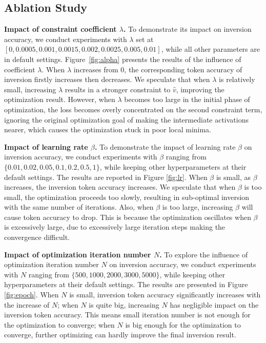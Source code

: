 \subsection{Ablation Study}

\noindent\textbf{Impact of constraint  coefficient $\lambda$.} To demonstrate its impact on inversion accuracy, we conduct experiments with $\lambda$ set at $[0,0.0005,0.001,0.0015,0.002,0.0025,0.005,0.01]$, while all other parameters are in default settings. Figure~\ref{fig:alpha}  presents the results of the influence of coefficient $\lambda$. When $\lambda$ increases from 0, the corresponding token accuracy of inversion firstly increases then decreases. We speculate that when $\lambda$ is relatively small, increasing $\lambda$ results in a stronger constraint to $\hat{v}$, improving the optimization result. 
However, when $\lambda$ becomes too large in the initial phase of optimization, the loss becomes overly concentrated on the second constraint term, ignoring the original optimization goal of making the intermediate activations nearer, which causes the optimization stuck in poor local minima.


\noindent\textbf{Impact of learning rate $\beta$.} To demonstrate the impact of learning rate $\beta$ on inversion accuracy, we conduct experiments with $\beta$ ranging from $\{0.01,0.02,0.05,0.1,0.2,0.5,1\}$, while keeping other hyperparameters at their default settings. The results are reported in Figure \ref{fig:lr}. When $\beta$ is small, as $\beta$ increases, the inversion token accuracy increases. We speculate that when $\beta$ is too small, the optimization proceeds too slowly, resulting in sub-optimal inversion with the same number of iterations. Also, when $\beta$ is too large, increasing $\beta$ will cause token accuracy to drop. 
This is because  the optimization oscillates when $\beta$ is excessively large, due to excessively large iteration steps making the convergence difficult.

\noindent\textbf{Impact of optimization iteration number $N$.} To explore the influence of optimization iteration number $N$ on inversion accuracy, we conduct experiments with $N$ ranging from $\{500,1000,2000,3000,5000\}$, while keeping other hyperparameters at their default settings. The results are presented in Figure \ref{fig:epoch}. When $N$ is small, inversion token accuracy significantly increases with the increase of $N$; when $N$ is quite big, increasing $N$ has negligible impact on the inversion token accuracy. This means small iteration number is not enough for the optimization to converge; when $N$ is big enough for the optimization to converge, further optimizing can hardly improve the final inversion result. 


